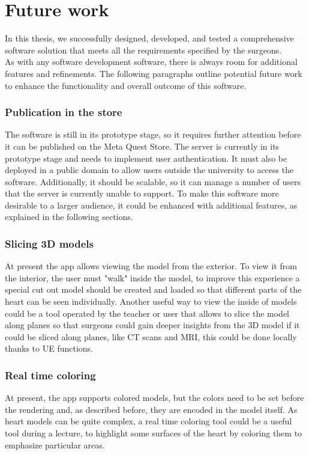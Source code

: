 
\chapter{Future work}
\label{chp:conclusions}
\noindent
In this thesis, we successfully designed, developed, and tested a comprehensive software solution that meets all the requirements specified by the surgeons.\\
As with any software development software, there is always room for additional features and refinements. The following paragraphs outline potential future work to enhance the functionality and overall outcome of this software.

\subsection{Publication in the store}
\noindent
The software is still in its prototype stage, so it requires further attention before it can be published on the Meta Quest Store.
The server is currently in its prototype stage and needs to implement user authentication. It must also be deployed in a public domain to allow users outside the university to access the software.
Additionally, it should be scalable, so it can manage a number of users that the server is currently unable to support.
To make this software more desirable to a larger audience, it could be enhanced with additional features, as explained in the following sections.



\subsection{Slicing 3D models}
\noindent
At present the app allows viewing the model from the exterior.
To view it from the interior, the user must "walk" inside the model, to improve this experience a special cut out model should be created and loaded so that different parts of the heart can be seen individually.
Another useful way to view the inside of models could be a tool operated by the teacher or user that allows to slice the model along planes so that surgeons could gain deeper insights from the 3D model if it could be sliced along planes, like \ac{CT} scans and \ac{MRI}, this could be done locally thanks to \ac{UE} functions.

\subsection{Real time coloring}
\noindent
At present, the app supports colored models, but the colors need to be set before the rendering and, as described before, they are encoded in the model itself.
As heart models can be quite complex, a real time coloring tool could be a useful tool during a lecture, to highlight some surfaces of the heart by coloring them to emphasize particular areas.

